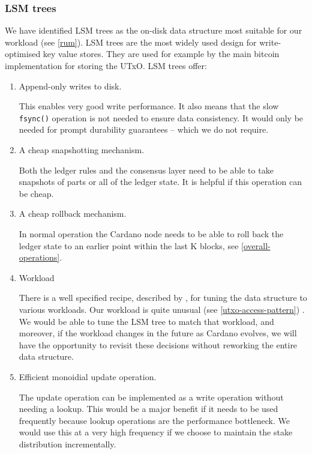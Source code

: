 \documentclass[11pt,a4paper]{article}
\begin{document}
\subsubsection{LSM trees}
We have identified LSM trees \citep{monkey} as the on-disk data structure most
suitable for our workload (see \cref{rum}). LSM trees are the most widely used
design for write-optimised key value stores. They are used for example by the
main bitcoin implementation for storing the UTxO. LSM trees offer:
\begin{enumerate}
  \item Append-only writes to disk.

        This enables very good write performance. It also means that the slow
        {\tt fsync()} operation is not needed to ensure data consistency. It
        would only be needed for prompt durability guarantees -- which we do
        not require.

  \item A cheap snapshotting mechanism.

        Both the ledger rules and the consensus layer need to be able to take
        snapshots of parts or all of the ledger state. It is helpful if this
        operation can be cheap.

  \item A cheap rollback mechanism.

        In normal operation the Cardano node needs to be able to roll back the
        ledger state to an earlier point within the last K blocks, see
        \cref{overall-operations}.

  \item Workload

        There is a  well specified recipe, described by \cite{monkey}, for
        tuning the data structure to various workloads. Our workload is quite
        unusual (see \cref{utxo-access-pattern}) . We would be able to tune the
        LSM tree to match that workload, and moreover, if the workload changes
        in the future as Cardano evolves, we will have the opportunity to
        revisit these decisions without reworking the entire data structure.

  \item Efficient monoidial {\sc update} operation.

        The {\sc update} operation can be implemented as a write operation
        without needing a {\sc lookup}. This would be a major benefit if it
        needs to be used frequently because {\sc lookup} operations are the
        performance bottleneck. We would use this at a very high frequency if
        we choose to maintain the stake distribution incrementally.
\end{enumerate}
\end{document}
